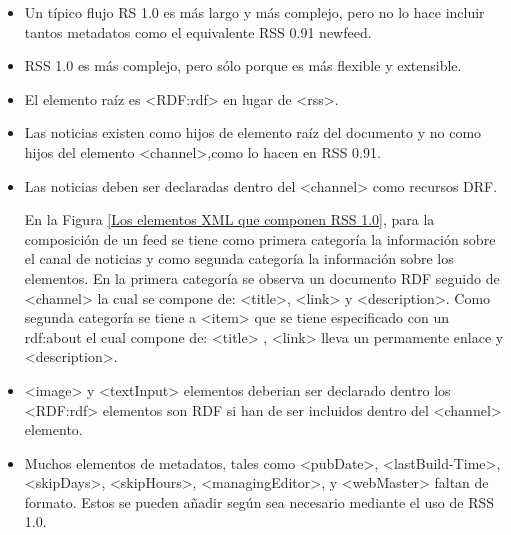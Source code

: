 \begin{itemize}

\item Un t\'{i}pico flujo RS 1.0 es m\'{a}s largo y m\'{a}s complejo, pero no lo hace incluir
tantos metadatos como el equivalente RSS 0.91 newfeed.

\item RSS 1.0 es m\'{a}s complejo, pero s\'{o}lo porque es m\'{a}s flexible y extensible.

\item El elemento ra\'{i}z es <RDF:rdf>  en lugar de <rss>.

\item Las noticias existen como hijos de elemento ra\'{i}z del documento y no como 
hijos del elemento <channel>,como lo hacen en RSS 0.91.

\item Las noticias deben ser declaradas dentro del <channel> como recursos DRF. \par

En la Figura \ref{Los elementos XML que componen RSS 1.0}, para la composici\'{o}n
de un feed se tiene como primera categor\'{i}a la informaci\'{o}n sobre el canal 
de noticias y como segunda categor\'{i}a la informaci\'{o}n sobre los elementos.
En la primera  categor\'{i}a se observa un documento RDF seguido de <channel> la
cual se compone de: <title>, <link> y <description>. Como segunda categor\'{i}a 
se tiene a <item> que se tiene especificado con un rdf:about el cual compone de:
<title> , <link> lleva un permamente enlace y <description>. 

\begin{minipage}{1.0\linewidth}
	\centering
	\label{Los elementos XML que componen RSS 1.0}
\end{minipage}

\item <image> y <textInput> elementos deberian ser declarado dentro los <RDF:rdf>
elementos son RDF si han de ser incluidos dentro del <channel> elemento.

\item Muchos elementos de metadatos, tales como  <pubDate>, <lastBuild-Time>, 
<skipDays>, <skipHours>, <managingEditor>, y <webMaster> faltan de formato.
Estos se pueden a\~{n}adir seg\'{u}n sea necesario mediante el uso de RSS 1.0.
\cite{johnson2006rss}

\end{itemize}

